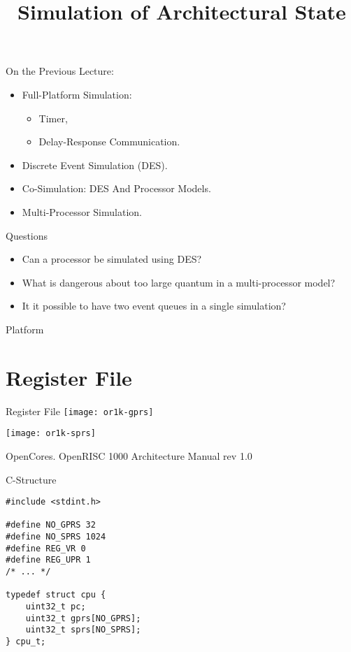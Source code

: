 

\title{Simulation of Architectural State}



\startslides

\begin{frame}{On the Previous Lecture:}
\begin{itemize}
\item Full-Platform Simulation:
  \begin{itemize}
  \item Timer,
  \item Delay-Response Communication.
  \end{itemize}
\item Discrete Event Simulation (DES).
\item Co-Simulation: DES And Processor Models.
\item Multi-Processor Simulation.
\end{itemize}
\end{frame}

\begin{frame}{Questions}
\begin{itemize}
\item Can a processor be simulated using DES?\pause
\item What is dangerous about too large quantum in a multi-processor model?\pause
\item It it possible to have two event queues in a single simulation?
\end{itemize}
\end{frame}

\begin{frame}{Platform}
\centering
\vfill
{}
\vfill
\end{frame}

\section{Register File}

\begin{frame}{Register File}
\centering
\texttt{[image: or1k-gprs]}

\texttt{[image: or1k-sprs]}

\tiny{OpenCores. OpenRISC 1000 Architecture Manual rev 1.0}
\end{frame}

\begin{frame}[fragile]{C-Structure}
\begin{lstlisting}
#include <stdint.h>

#define NO_GPRS 32
#define NO_SPRS 1024
#define REG_VR 0
#define REG_UPR 1
/* ... */

typedef struct cpu {
    uint32_t pc;
    uint32_t gprs[NO_GPRS];
    uint32_t sprs[NO_SPRS];
} cpu_t;
\end{lstlisting}
\end{frame}


